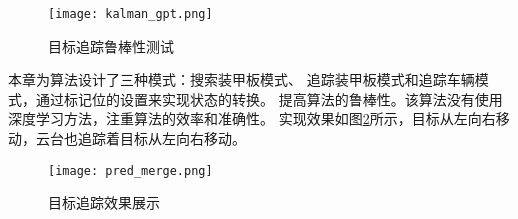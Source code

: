 \begin{figure}[H]
    \centering
    \texttt{[image: kalman\_gpt.png]} 
    \caption{目标追踪鲁棒性测试} 
    \label{kalman_gpt} 
\end{figure} 

\par
本章为算法设计了三种模式：搜索装甲板模式、
追踪装甲板模式和追踪车辆模式，通过标记位的设置来实现状态的转换。
提高算法的鲁棒性。该算法没有使用深度学习方法，注重算法的效率和准确性。
实现效果如图\ref{pred_merge}所示，目标从左向右移动，云台也追踪着目标从左向右移动。

\begin{figure}[H]
    \centering
    \texttt{[image: pred\_merge.png]} 
    \caption{目标追踪效果展示} 
    \label{pred_merge} 
\end{figure} 